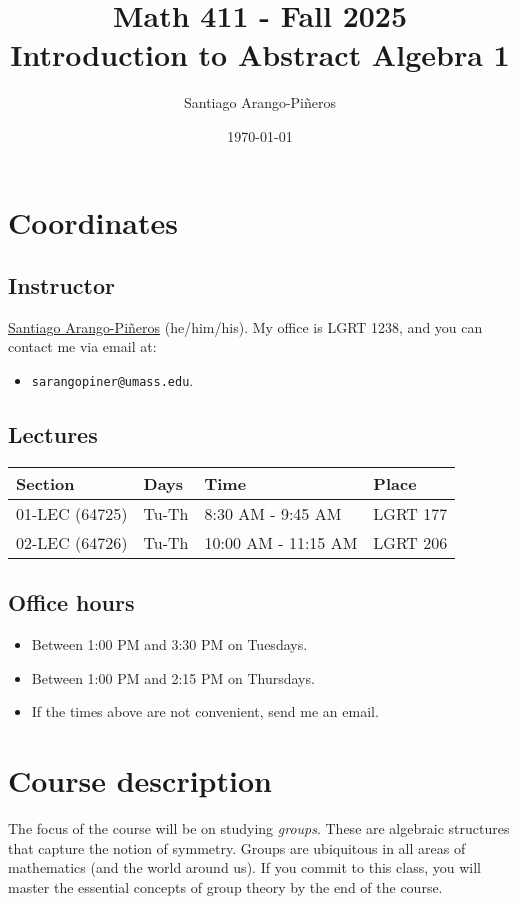 \documentclass[11pt]{article}
\author{Santiago Arango-Piñeros}
\date{\today}
\title{Math 411 - Fall 2025\\\medskip
\large Introduction to Abstract Algebra 1}
\begin{document}
\maketitle
\tableofcontents


\section*{Coordinates}
\label{sec:org5b4f823}
\subsection*{Instructor}
\label{sec:org6cba718}
\href{https://sarangop1728.github.io/}{Santiago Arango-Piñeros} (he/him/his).
My office is LGRT 1238, and you can contact me via email at:
\begin{itemize}
\item \texttt{sarangopiner@umass.edu}.
\end{itemize}

\subsection*{Lectures}
\label{sec:org76a5a90}
\begin{center}
\begin{tabular}{l|l|l|l}
\hline
Section & Days & Time & Place\\[0pt]
\hline
01-LEC (64725) & Tu-Th & 8:30 AM - 9:45 AM & LGRT 177\\[0pt]
02-LEC (64726) & Tu-Th & 10:00 AM - 11:15 AM & LGRT 206\\[0pt]
\hline
\end{tabular}
\end{center}

\subsection*{Office hours}
\label{sec:org529b9de}
\begin{itemize}
\item Between 1:00 PM and 3:30 PM on Tuesdays.
\item Between 1:00 PM and 2:15 PM on Thursdays.
\item If the times above are not convenient, send me an email.
\end{itemize}

\section*{Course description}
\label{sec:orgdde4100}
The focus of the course will be on studying \emph{groups}. These are algebraic
structures that capture the notion of symmetry. Groups are ubiquitous in all
areas of mathematics (and the world around us). If you commit to this class,
you will master the essential concepts of group theory by the end of the
course.
\end{document}
